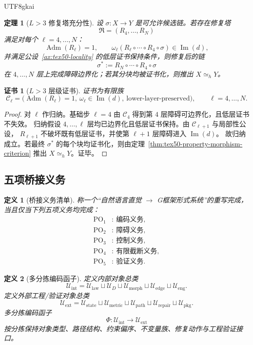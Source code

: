\documentclass[12pt]{article}
\newtheorem{definition}{定义}[section]
\newtheorem{theorem}{定理}[section]
\newtheorem{Certificate}{证书}[section]
\newcommand{\Imop}{\operatorname{Im}}
\newcommand{\Adm}{\operatorname{Adm}}
\begin{document}
\begin{CJK*}{UTF8}{gkai}
\begin{theorem}[\texorpdfstring{$L>3$}{L>3} 修复塔充分性]
\label{thm:tex50-lgt3-tower}
设 $\sigma:X\to Y$ 是可允许候选链。若存在修复塔
\[
  \mathfrak R=(R_4,\dots,R_N)
\]
满足对每个 $\ell=4,\dots,N$：
\[
  \Adm(R_\ell)=1,
  \qquad
  \omega_\ell(R_\ell\circ\cdots\circ R_4\circ\sigma)\in\Imop(d),
\]
并满足公设~\ref{ax:tex50-locality} 的低层证书保持条件，则修复后的链
\[
  \sigma^\ast:=R_N\circ\cdots\circ R_4\circ\sigma
\]
在 $4,\dots,N$ 层上完成障碍边界化；若其分块均被证书化，则推出 $X\simeq_hY$。
\end{theorem}

\begin{Certificate}[\texorpdfstring{$L>3$}{L>3} 层级证书]
证书为有限族
\[
  \mathcal C_\ell
  =
  \bigl(
    \Adm(R_\ell)=1,\ 
    \omega_\ell\in\Imop(d),\
    \text{lower-layer-preserved}
  \bigr),
  \qquad
  \ell=4,\dots,N.
\]
\end{Certificate}

\begin{proof}
对 $\ell$ 作归纳。基础步 $\ell=4$ 由 $\mathcal C_4$ 得到第 $4$ 层障碍可边界化，且低层证书不失效。
归纳假设 $4,\dots,\ell$ 层均已边界化且低层证书保持。由 $\mathcal C_{\ell+1}$ 与局部性公设，
$R_{\ell+1}$ 不破坏既有低层证书，并使第 $\ell+1$ 层障碍进入 $\Imop(d)$。
故归纳成立。若最终 $\sigma^\ast$ 的每个块均证书化，则由定理~\ref{thm:tex50-property-morphism-criterion}
推出 $X\simeq_hY$。证毕。
\end{proof}

\subsection{五项桥接义务}
\label{subsec:tex50-po-list}

\begin{definition}[桥接义务清单]
称一个“自然语言直觉 $\to$ G框架形式系统”的重写完成，当且仅当下列五项义务均完成：
\[
\begin{aligned}
  \mathrm{PO}_1&:\ \text{编码义务},\\
  \mathrm{PO}_2&:\ \text{障碍义务},\\
  \mathrm{PO}_3&:\ \text{控制义务},\\
  \mathrm{PO}_4&:\ \text{有限截断义务},\\
  \mathrm{PO}_5&:\ \text{验证义务}.
\end{aligned}
\]
\end{definition}

\begin{definition}[多分拣编码函子]
\label{def:tex50-many-sorted-encoding}
定义内部对象总类
\[
  \mathcal U_{\mathrm{int}}
  =
  \mathcal U_{\mathrm{law}}
  \sqcup
  \mathcal U_D
  \sqcup
  \mathcal U_{\mathrm{morph}}
  \sqcup
  \mathcal U_{\mathrm{edge}}
  \sqcup
  \mathcal U_{\mathrm{eng}}.
\]
定义外部工程/验证对象总类
\[
  \mathcal U_{\mathrm{ext}}
  =
  \mathcal U_{\mathrm{state}}
  \sqcup
  \mathcal U_{\mathrm{metric}}
  \sqcup
  \mathcal U_{\mathrm{path}}
  \sqcup
  \mathcal U_{\mathrm{repair}}
  \sqcup
  \mathcal U_{\mathrm{pkg}}.
\]
多分拣编码函子
\[
  \Phi:\mathcal U_{\mathrm{int}}\to\mathcal U_{\mathrm{ext}}
\]
按分拣保持对象类型、路径结构、约束偏序、不变量族、修复动作与工程验证接口。
\end{definition}


\end{CJK*}
\end{document}

